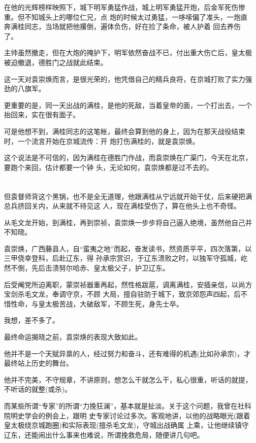 \documentclass[11pt,a4paper,onecolumn]{article}
\begin{document}
在他的光辉榜样映照下，城下明军勇猛作战，城上明军勇猛开炮，后金军死伤惨重。但不知城头上的哪位仁兄，点
炮的时候太过勇猛，一哆嗦偏了准头，一炮直奔满桂同志，当场就把他撂倒，遍体负伤，好在捡了条命，被人护着
回去养伤了。

主帅虽然撤走，但在大炮的掩护下，明军依然奋战不已，付出重大伤亡后，皇太极被迫撤退，德胜门之战就此结束。

这一天对袁崇焕而言，是很光荣的，他凭借自己的精兵良将，在京城打败了实力强劲的八旗军。

更重要的是，同一天出战的满桂，是他的死敌，当着皇帝的面，一个打出去，一个抬回来，实在很有面子。

可是他想不到，满桂同志的这笔帐，最终会算到他的身上，因为在那天战役结束时，一个流言开始在京城流传：开
炮打伤满桂的，就是袁崇焕。

这个说法是不可信的，因为满桂在德胜门作战，而袁崇焕在广渠门，今天在北京，要跑个来回，估计都要一个钟
头，无论如何，袁崇焕都是过不去的。

\section[\thesection]{}

但袁督师背这个黑锅，也不是全无道理，他跟满桂从宁远就开始干仗，后来硬把满总兵挤回关内，从来就不待见这
人，现在满桂受伤了，算在他头上也不奇怪。

从毛文龙开始，到满桂，再到崇祯，袁崇焕一步步将自己逼入绝境，虽然他自己并不知晓。

袁崇焕，广西藤县人，自``蛮夷之地''而起，奋发读书，然资质平平，四次落第，以三甲侥幸登科，后赴辽东，得
孙承宗赏识，于辽东溃败之时，以独军守孤城，屹然不倒，先后击溃努尔哈赤、皇太极父子，护卫辽东。

后受阉党所迫离职，蒙崇祯器重再起，然性格跋扈，调离满桂，安插亲信，以尚方宝剑杀毛文龙，奉调守京，不顾
大局，擅自驻防于城下，致京郊怨声四起，后不惜性命，与皇太极苦战，大破敌军，不顾生死，身先士卒。

我想，差不多了。

最终命运揭晓之前，袁崇焕的表现大致如此。

他并不是一个天赋异禀的人，经过努力和奋斗，还有难得的机遇(比如孙承宗)，才最终站上历史的舞台。

他并不完美，不守规章，不讲原则，想怎么干就怎么干，私心很重，听话的就提，不听话的就整(或杀)。

而某些所谓``专家''的所谓``力挽狂澜''，基本就是扯淡。关于这个问题，我曾在社科院明史学会的例会上，跟明
史专家讨论过多次。客观地讲，以他的战略眼光(跟着皇太极绕京城跑圈)和实际表现(擅杀毛文龙)，守城出战确属
上乘，让他继续镇守辽东，还能闹出什么事来也难说，所谓挽救危局，随便讲几句吧。
\end{document}
